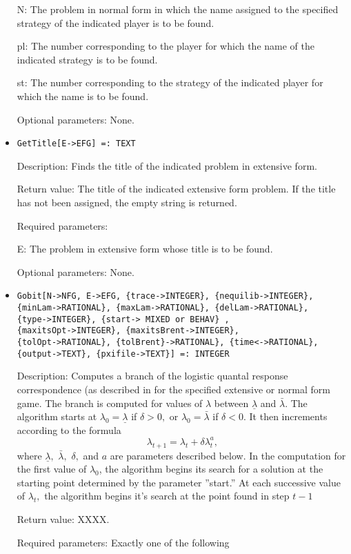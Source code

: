 \begin{itemize}
\bd
\item
[N:] The problem in normal form in which the name assigned to the
specified strategy of the indicated player is to be found.
\item
[pl:] The number corresponding to the player for which the name of the
indicated strategy is to be found.
\item
[st:] The number corresponding to the strategy of the indicated player
for which the name is to be found.
\ed

\item
[Optional parameters:] None.
\ed

\item
\protect \large \begin{verbatim}
GetTitle[E->EFG] =: TEXT
\end{verbatim}\normalsize

\bd
\item
[Description:] Finds the title of the indicated problem in extensive
form.
\item
[Return value:] The title of the indicated extensive form problem.  If
the title has not been assigned, the empty string is returned.
\item
[Required parameters:]\hfil\null

\bd
\item
[E:] The problem in extensive form whose title is to be found.
\ed

\item
[Optional parameters:] None.
\ed

\item
\protect \large \begin{verbatim}
Gobit[N->NFG, E->EFG, {trace->INTEGER}, {nequilib->INTEGER},
{minLam->RATIONAL}, {maxLam->RATIONAL}, {delLam->RATIONAL},
{type->INTEGER}, {start-> MIXED or BEHAV} ,
{maxitsOpt->INTEGER}, {maxitsBrent->INTEGER},
{tolOpt->RATIONAL}, {tolBrent}->RATIONAL}, {time<->RATIONAL},
{output->TEXT}, {pxifile->TEXT}] =: INTEGER
\end{verbatim}\normalsize

\bd
\item
[Description:] Computes a branch of the logistic quantal response
correspondence (as described in \cite[1995]{MckPal:1994} for 
the specified extensive or normal form game.  The branch is computed
for values of $\lambda$ between $\underline{\lambda}$ and
$\bar{\lambda}.$ The algorithm starts at $\lambda_0 =
\underline{\lambda}$ if $\delta>0,$ or $\lambda_0 = \bar{\lambda}$ 
if $\delta<0$. It then increments according to the formula 
$$
\lambda_{t+1} = \lambda_t +\delta \lambda_t^a,
$$ 
where $\underline\lambda,$ $\bar\lambda,$ $\delta,$ and $a$ are
parameters described below. In the computation for the first value of
$\lambda_0$, the algorithm begins its search for a solution at the
starting point determined by the parameter ''start.''  At each
successive value of $\lambda_t,$ the algorithm begins it's search at
the point found in step $t - 1$
\item
[Return value:] XXXX.
\item 
[Required parameters:]\hfil\null Exactly one of the following


\end{itemize}
